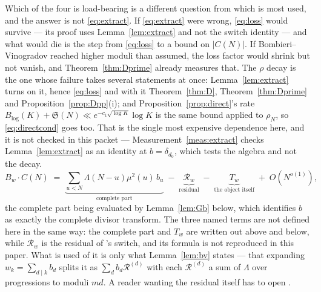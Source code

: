\documentclass[11pt,a4paper]{article}
\theoremstyle{plain}
\theoremstyle{definition}
\theoremstyle{remark}
\renewcommand{\SS}{\mathfrak{S}}
\begin{document}
Which of the four is load-bearing is a different question from which
is most used, and the answer is not \eqref{eq:extract}. If
\eqref{eq:extract} were wrong, \eqref{eq:loss} would survive --- its
proof uses Lemma~\ref{lem:extract} and not the switch identity --- and
what would die is the step from \eqref{eq:loss} to a bound on
$|C(N)|$. If Bombieri--Vinogradov reached higher moduli than assumed,
the loss factor would shrink but not vanish, and
Theorem~\ref{thm:Dprime} already measures that. The $\rho$ decay is the
one whose failure takes several statements at once:
Lemma~\ref{lem:extract} turns on it, hence \eqref{eq:loss} and with it
Theorem~\ref{thm:D}, Theorem~\ref{thm:Dprime} and
Proposition~\ref{prop:Dpp}(i); and Proposition~\ref{prop:direct}'s rate
$B_{\log}(K)+\SS(N)\ll e^{-c_1\sqrt{\log K}}\log K$ is the same bound
applied to $\rho_N$, so \eqref{eq:directcond} goes too. That is the
single most expensive dependence here, and it is not checked in this
packet --- Measurement~\ref{meas:extract} checks
Lemma~\ref{lem:extract} as an identity at $b=\delta_{d_0}$, which
tests the algebra and not the decay.
\begin{equation}\label{eq:extract}
  B_w\cdot C(N)\;=\;
  \underbrace{\sum_{u<N}\Lambda(N-u)\mu^2(u)\,b_u}_{\text{complete part}}
  \;-\;\underbrace{\mathcal R_w}_{\text{residual}}
  \;-\;\underbrace{T_w}_{\text{the object itself}}
  \;+\;O\!\left(N^{o(1)}\right),
\end{equation}
the complete part being evaluated by Lemma~\ref{lem:Gb} below, which
identifies $b$ as exactly the complete divisor transform. The three
named terms are not defined here in the same way: the complete part
and $T_w$ are written out above and below, while $\mathcal R_w$ is the
residual of \cite{P1}'s switch, and its formula is not reproduced in
this paper. What is used of it is only what
Lemma~\ref{lem:bv} states --- that expanding $w_k=\sum_{d\mid k}b_d$
splits it as $\sum_db_d\mathcal R^{(d)}$ with each
$\mathcal R^{(d)}$ a sum of $\Lambda$ over progressions to moduli $md$.
A reader wanting the residual itself has to open \cite{P1}.
\end{document}
